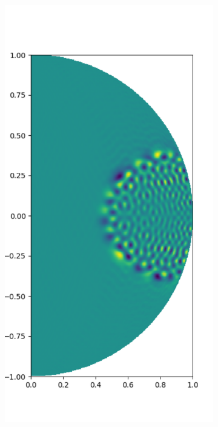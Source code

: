 \documentclass[11pt, oneside]{article}   	%
\begin{document}
\begin{figure}
\begin{subfigure}[t]{0.3\textwidth}
	\caption{}
	\label{fig:solution-poisson}
	\end{subfigure}
	\begin{subfigure}[t]{0.3\textwidth}
	\centering
	\includegraphics[scale=0.3]{solution-helmholtz}
	\caption{}
	\label{fig:solution-helmholtz}

\end{subfigure}
\end{figure}
\end{document}
